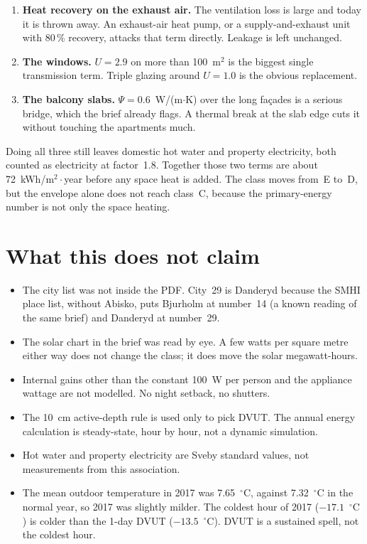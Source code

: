 \documentclass[11pt,a4paper]{article}
\newcommand{\degC}{\ensuremath{^{\circ}\mathrm{C}}}
\newcommand{\WmK}{W/(m$\cdot$K)}
\begin{document}
\begin{enumerate}
  \item \textbf{Heat recovery on the exhaust air.}
        The ventilation loss is large and today it is thrown away.
        An exhaust-air heat pump, or a supply-and-exhaust unit with
        80\,\% recovery, attacks that term directly.
        Leakage is left unchanged.
  \item \textbf{The windows.}
        $U = 2.9$ on more than 100~m$^{2}$ is the biggest single
        transmission term. Triple glazing around $U = 1.0$ is the
        obvious replacement.
  \item \textbf{The balcony slabs.}
        $\Psi = 0.6$~\WmK{} over the long fa\c{c}ades is a serious
        bridge, which the brief already flags. A thermal break at the
        slab edge cuts it without touching the apartments much.
\end{enumerate}

Doing all three still leaves domestic hot water and property electricity,
both counted as electricity at factor~1.8. Together those two terms are
about 72~kWh/m$^{2}{\cdot}$year before any space heat is added.
The class moves from~E to~D, but the envelope alone does not reach
class~C, because the primary-energy number is not only the space heating.

\section{What this does not claim}

\begin{itemize}
  \item The city list was not inside the PDF. City~29 is Danderyd because
        the SMHI place list, without Abisko, puts Bjurholm at number~14
        (a known reading of the same brief) and Danderyd at number~29.
  \item The solar chart in the brief was read by eye. A few watts per square
        metre either way does not change the class; it does move the
        solar megawatt-hours.
  \item Internal gains other than the constant 100~W per person and the
        appliance wattage are not modelled. No night setback, no shutters.
  \item The 10~cm active-depth rule is used only to pick DVUT. The annual
        energy calculation is steady-state, hour by hour, not a dynamic
        simulation.
  \item Hot water and property electricity are Sveby standard values, not
        measurements from this association.
  \item The mean outdoor temperature in 2017 was 7.65~\degC, against
        7.32~\degC{} in the normal year, so 2017 was slightly milder.
        The coldest hour of 2017 ($-17.1$~\degC) is colder than the
        1-day DVUT ($-13.5$~\degC). DVUT is a sustained spell, not the
        coldest hour.
\end{itemize}
\end{document}
